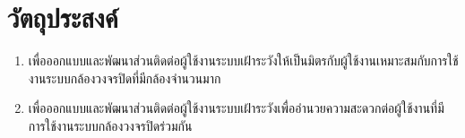 \section{วัตถุประสงค์}
\begin{enumerate}
	\item เพื่อออกแบบและพัฒนาส่วนติดต่อผู้ใช้งานระบบเฝ้าระวังให้เป็นมิตรกับผู้ใช้งานเหมาะสมกับการใช้งานระบบกล้องวงจรปิดที่มีกล้องจำนวนมาก\\
	\item เพื่อออกแบบและพัฒนาส่วนติดต่อผู้ใช้งานระบบเฝ้าระวังเพื่ออำนวยความสะดวกต่อผู้ใช้งานที่มีการใช้งานระบบกล้องวงจรปิดร่วมกัน\\
\end{enumerate}
